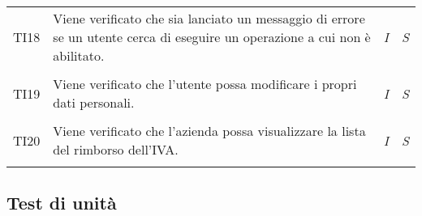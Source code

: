 \begin{longtable}{ >{\centering}p{} >{}p{}
				>{\centering}p{} >{\centering}p{}}
			\tabularnewline
			\hypertarget{TI18}{TI18} & Viene verificato che sia lanciato un messaggio di 
			errore se un utente cerca di eseguire un operazione a cui non è abilitato. & 
			\textit{I} & \textit{S}\\
			
			\tabularnewline
			\hypertarget{TI19}{TI19} & Viene verificato che l'utente possa modificare i 
			propri dati personali. & \textit{I} & \textit{S}\\
			
			\tabularnewline
			\hypertarget{TI20}{TI20} & Viene verificato che l'azienda possa visualizzare 
			la lista del rimborso dell'IVA. & \textit{I} & \textit{S}\\

				
			\tabularnewline
		\end{longtable}

\subsection{Test di unità}
	\renewcommand{\arraystretch}{1.5}
		
